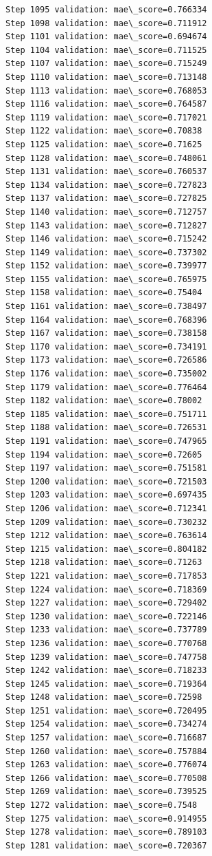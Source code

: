 \documentclass[11pt]{article}
\begin{document}
\begin{Verbatim}[commandchars=\\\{\}]
Step 1095 validation: mae\_score=0.766334
Step 1098 validation: mae\_score=0.711912
Step 1101 validation: mae\_score=0.694674
Step 1104 validation: mae\_score=0.711525
Step 1107 validation: mae\_score=0.715249
Step 1110 validation: mae\_score=0.713148
Step 1113 validation: mae\_score=0.768053
Step 1116 validation: mae\_score=0.764587
Step 1119 validation: mae\_score=0.717021
Step 1122 validation: mae\_score=0.70838
Step 1125 validation: mae\_score=0.71625
Step 1128 validation: mae\_score=0.748061
Step 1131 validation: mae\_score=0.760537
Step 1134 validation: mae\_score=0.727823
Step 1137 validation: mae\_score=0.727825
Step 1140 validation: mae\_score=0.712757
Step 1143 validation: mae\_score=0.712827
Step 1146 validation: mae\_score=0.715242
Step 1149 validation: mae\_score=0.737302
Step 1152 validation: mae\_score=0.739977
Step 1155 validation: mae\_score=0.765975
Step 1158 validation: mae\_score=0.75404
Step 1161 validation: mae\_score=0.738497
Step 1164 validation: mae\_score=0.768396
Step 1167 validation: mae\_score=0.738158
Step 1170 validation: mae\_score=0.734191
Step 1173 validation: mae\_score=0.726586
Step 1176 validation: mae\_score=0.735002
Step 1179 validation: mae\_score=0.776464
Step 1182 validation: mae\_score=0.78002
Step 1185 validation: mae\_score=0.751711
Step 1188 validation: mae\_score=0.726531
Step 1191 validation: mae\_score=0.747965
Step 1194 validation: mae\_score=0.72605
Step 1197 validation: mae\_score=0.751581
Step 1200 validation: mae\_score=0.721503
Step 1203 validation: mae\_score=0.697435
Step 1206 validation: mae\_score=0.712341
Step 1209 validation: mae\_score=0.730232
Step 1212 validation: mae\_score=0.763614
Step 1215 validation: mae\_score=0.804182
Step 1218 validation: mae\_score=0.71263
Step 1221 validation: mae\_score=0.717853
Step 1224 validation: mae\_score=0.718369
Step 1227 validation: mae\_score=0.729402
Step 1230 validation: mae\_score=0.722146
Step 1233 validation: mae\_score=0.737789
Step 1236 validation: mae\_score=0.770768
Step 1239 validation: mae\_score=0.747758
Step 1242 validation: mae\_score=0.718233
Step 1245 validation: mae\_score=0.719364
Step 1248 validation: mae\_score=0.72598
Step 1251 validation: mae\_score=0.720495
Step 1254 validation: mae\_score=0.734274
Step 1257 validation: mae\_score=0.716687
Step 1260 validation: mae\_score=0.757884
Step 1263 validation: mae\_score=0.776074
Step 1266 validation: mae\_score=0.770508
Step 1269 validation: mae\_score=0.739525
Step 1272 validation: mae\_score=0.7548
Step 1275 validation: mae\_score=0.914955
Step 1278 validation: mae\_score=0.789103
Step 1281 validation: mae\_score=0.720367

\end{Verbatim}
\end{document}
